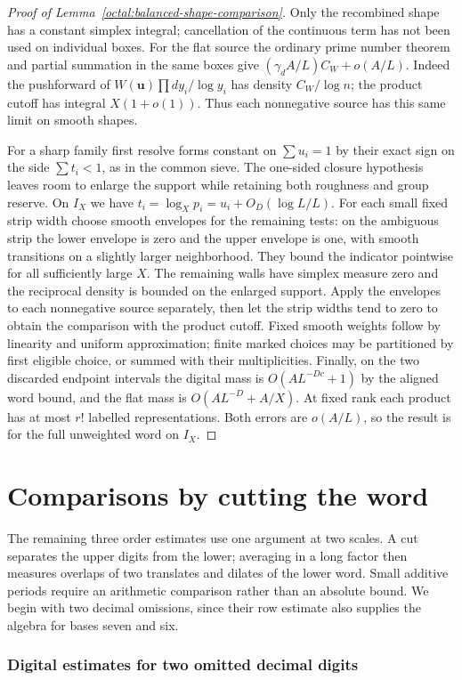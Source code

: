 \documentclass[11pt,a4paper]{article}
\theoremstyle{paperplain}
\numberwithin{equation}{section}
\begin{document}
\begin{proof}[Proof of Lemma~\ref{octal:balanced-shape-comparison}]
Only the recombined shape has a constant simplex integral; cancellation
of the continuous term has not been used on individual boxes.
For the flat source the ordinary prime number theorem and partial
summation in the same boxes give $(\gamma_d A/L)C_W+o(A/L)$.
Indeed the pushforward of $W(\boldsymbol u)\prod dy_i/\log y_i$
has density $C_W/\log n$; the product cutoff has integral $X(1+o(1))$.
Thus each nonnegative source has this same limit on smooth shapes.

For a sharp family first resolve forms constant on $\sum u_i=1$ by
their exact sign on the side $\sum t_i<1$, as in the common sieve.
The one-sided closure hypothesis leaves room to enlarge the support
while retaining both roughness and group reserve. On $I_X$ we have
$t_i=\log_X p_i=u_i+O_D(\log L/L)$. For each small fixed strip width
choose smooth envelopes for the remaining tests: on the ambiguous
strip the lower envelope is zero and the upper envelope is one, with
smooth transitions on a slightly larger neighborhood. They bound the
indicator pointwise for all sufficiently large $X$. The remaining
walls have simplex measure zero and the reciprocal density is bounded
on the enlarged support. Apply the envelopes to each nonnegative
source separately, then let the strip widths tend to zero to obtain the
comparison with the product cutoff. Fixed smooth weights follow by
linearity and uniform approximation; finite marked choices may be
partitioned by first eligible choice, or summed with their multiplicities.
Finally, on the two discarded endpoint intervals the digital mass is
$O(A L^{-Dc}+1)$ by the aligned word bound, and the flat mass is
$O(A L^{-D}+A/X)$. At fixed rank each product has at most $r!$
labelled representations. Both errors are $o(A/L)$, so the result is
for the full unweighted word on $I_X$.
\end{proof}

\part{Comparisons by cutting the word}\label{part:cuts}
The remaining three order estimates use one argument at two scales.
A cut separates the upper digits from the lower; averaging in a
long factor then measures overlaps of two translates and dilates
of the lower word. Small additive periods require an arithmetic
comparison rather than an absolute bound. We begin with two
decimal omissions, since their row estimate also supplies the
algebra for bases seven and six.

\section{Digital estimates for two omitted decimal digits}
\label{dt:digit-section}
\end{document}
